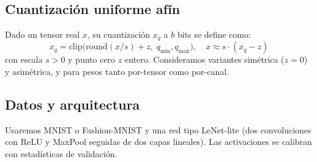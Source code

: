 \
        \subsection*{Cuantización uniforme afín}
        Dado un tensor real $x$, su cuantización $x_q$ a $b$ bits se define como:
        \[ x_q = \mathrm{clip}\big(\mathrm{round}(x/s) + z,\; q_{\min}, q_{\max}\big), \quad
           x \approx s \cdot (x_q - z) \]
        con escala $s>0$ y punto cero $z$ entero. Consideramos variantes simétrica ($z=0$) y
        asimétrica, y para pesos tanto por-tensor como por-canal.

        \subsection*{Datos y arquitectura}
        Usaremos MNIST o Fashion-MNIST y una red tipo LeNet-lite (dos convoluciones con
        ReLU y MaxPool seguidas de dos capas lineales). Las activaciones se calibran con
        estadísticas de validación.
